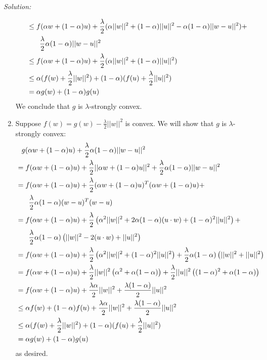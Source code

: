 \documentclass[
10pt, %
a4paper, %
oneside, %
headinclude,footinclude, %
BCOR5mm, %
]{scrartcl}
\newenvironment{solution}
               {\textit{Solution:}}
               {}
\begin{document}
\begin{solution}
\begin{enumerate}[label=(\alph*)]
\begin{align*}
        &\leq f(\alpha w + (1-\alpha)u) + \frac{\lambda}{2}(\alpha||w||^2 + (1-\alpha)||u||^2 - \alpha(1-\alpha)||w-u||^2) + \\
        &\hphantom{\leq} \quad \frac{\lambda}{2}\alpha(1-\alpha)||w-u||^2 \\
        &\leq f(\alpha w + (1-\alpha)u) + \frac{\lambda}{2}(\alpha||w||^2 + (1-\alpha)||u||^2) \\
        &\leq \alpha (f(w) + \frac{\lambda}{2}||w||^2) + (1-\alpha)(f(u) + \frac{\lambda}{2}||u||^2) \\
        &= \alpha g(w) + (1-\alpha)g(u)
      \end{align*}
        We conclude that $g$ is $\lambda$-strongly convex.
      \item Suppose $f(w) = g(w) - \frac{\lambda}{2}||w||^2$ is convex. We will show that $g$ is $\lambda$-strongly convex:
        \begin{align*}
          &\hphantom{=} g(\alpha w + (1-\alpha)u) + \frac{\lambda}{2}\alpha(1-\alpha)||w-u||^2 \\
          &= f(\alpha w + (1-\alpha)u) + \frac{\lambda}{2}||\alpha w + (1-\alpha) u||^2 + \frac{\lambda}{2}\alpha(1-\alpha)||w-u||^2 \\
          &= f(\alpha w + (1-\alpha)u) + \frac{\lambda}{2}(\alpha w + (1-\alpha) u)^T(\alpha w + (1-\alpha) u) + \\
          &\hphantom{=} \quad \frac{\lambda}{2}\alpha(1-\alpha)(w-u)^T(w-u) \\
          &= f(\alpha w + (1-\alpha)u) + \frac{\lambda}{2}\left(\alpha^2||w||^2+2\alpha(1-\alpha)(u\cdot w) + (1-\alpha)^2||u||^2\right) + \\
          &\hphantom{=} \quad\frac{\lambda}{2}\alpha(1-\alpha)\left(||w||^2 - 2(u\cdot w) + ||u||^2\right) \\
          &= f(\alpha w + (1-\alpha)u) + \frac{\lambda}{2}\left(\alpha^2||w||^2 + (1-\alpha)^2||u||^2\right) + \frac{\lambda}{2}\alpha(1-\alpha)\left(||w||^2 + ||u||^2\right) \\
          &= f(\alpha w + (1-\alpha)u) + \frac{\lambda}{2}||w||^2\left(\alpha^2 + \alpha(1-\alpha)\right) + \frac{\lambda}{2}||u||^2\left((1-\alpha)^2 + \alpha(1-\alpha)\right) \\
          &= f(\alpha w + (1-\alpha)u) + \frac{\lambda\alpha}{2}||w||^2 + \frac{\lambda(1-\alpha)}{2}||u||^2 \\
          &\leq \alpha f(w) + (1-\alpha)f(u) + \frac{\lambda\alpha}{2}||w||^2 + \frac{\lambda(1-\alpha)}{2}||u||^2 \\
          &\leq \alpha (f(w) + \frac{\lambda}{2}||w||^2) + (1-\alpha)(f(u) + \frac{\lambda}{2}||u||^2) \\
          &= \alpha g(w) + (1-\alpha)g(u)
        \end{align*}
        as desired.


\end{enumerate}
\end{solution}
\end{document}
